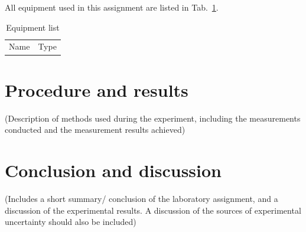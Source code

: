 \documentclass[12pt]{article}
\begin{document}
All equipment used in this assignment are listed in Tab.~\ref{tab:equipmentlist}.
\begin{table}[h]
	\caption{Equipment list}
	\label{tab:equipmentlist}
	\begin{tabular}{|l|l|}
		\hline
		Name                       & Type        \\ 
	\end{tabular}
\end{table}
\noindent
\section{Procedure and results}
(Description of methods used during the experiment, including the measurements conducted and the measurement results achieved)
\section{Conclusion and discussion}
(Includes a short summary/ conclusion of the laboratory assignment, and a discussion of the experimental results. A discussion of the sources of experimental uncertainty should also be included)




\clearpage


\end{document}
